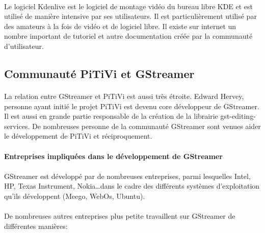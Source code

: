 \paragraph{}

Le logiciel Kdenlive est le logiciel de montage vidéo du bureau libre
KDE et est utilisé de manière intensive par ses utilisateurs. Il est
particulièrement utilisé par des amateurs à la fois de vidéo et de
logiciel libre. Il existe sur internet un nombre important de tutoriel
et autre documentation créée par la communauté d'utilisateur.

\subsection {Communauté PiTiVi et GStreamer}

\paragraph {}

La relation entre GStreamer et PiTiVi est aussi très étroite. Edward
Hervey, personne ayant initié le projet PiTiVi est devenu core
développeur de GStreamer. Il est aussi en grande partie responsable de
la création de la librairie gst-editing-services. De nombreuses personne
de la communauté GStreamer sont venues aider le développement de PiTiVi
et réciproquement.

\paragraph {Entreprises impliquées dans le développement de GStreamer}

\paragraph{}

GStreamer est développé par de nombreuses entreprises, parmi lesquelles
Intel, HP, Texas Instrument, Nokia\ldots dans le cadre des différents
systèmes d'exploitation qu'ils développent (Meego, WebOs, Ubuntu).

\paragraph{}

De nombreuses autres entreprises plus petite travaillent sur GStreamer
de différentes manières:

